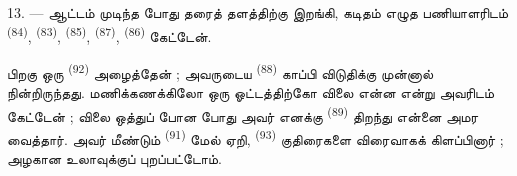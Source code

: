 13. --- ஆட்டம் முடிந்த போது தரைத் தளத்திற்கு இறங்கி, கடிதம் எழுத
பணியாளரிடம்  \textsuperscript{(84)}, 
\textsuperscript{(83)},  \textsuperscript{(85)},
 \textsuperscript{(87)},  \textsuperscript{(86)}
கேட்டேன்.

பிறகு ஒரு  \textsuperscript{(92)} அழைத்தேன் ;
அவருடைய  \textsuperscript{(88)} காப்பி விடுதிக்கு முன்னால்
நின்றிருந்தது. மணிக்கணக்கிலோ ஒரு ஓட்டத்திற்கோ விலை என்ன என்று
அவரிடம் கேட்டேன் ; விலை ஒத்துப் போன போது அவர் எனக்கு  \textsuperscript{(89)} திறந்து என்னை அமர வைத்தார். அவர்
மீண்டும்  \textsuperscript{(91)} மேல்
ஏறி,  \textsuperscript{(93)} குதிரைகளை
விரைவாகக் கிளப்பினார் ; அழகான உலாவுக்குப் புறப்பட்டோம்.

\VUsaut{6.0mm}
\VUfilet{22mm}
